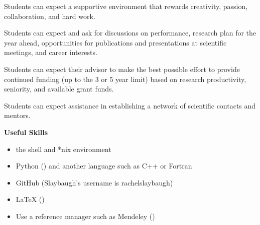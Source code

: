 \documentclass[12pt,twoside]{article}
\begin{document}
Students can expect a supportive environment that rewards creativity, passion, collaboration, and hard work.

Students can expect and ask for discussions on performance, research plan for the year ahead, opportunities for publications and presentations at scientific meetings, and career interests.

Students can expect their advisor to make the best possible effort to provide continued funding (up to the 3 or 5 year limit) based on research productivity, seniority, and available grant funds.

Students can expect assistance in establishing a network of scientific contacts and mentors.

\vspace*{2 em}
\begin{center}
\textbf{Useful Skills}
\end{center}

\begin{itemize}
\item the shell and *nix environment
\item Python () and another language such as C++ or Fortran
\item GitHub (Slaybaugh's username is rachelslaybaugh)
\item LaTeX ()
\item Use a reference manager such as Mendeley ()
\end{itemize}
\end{document}

